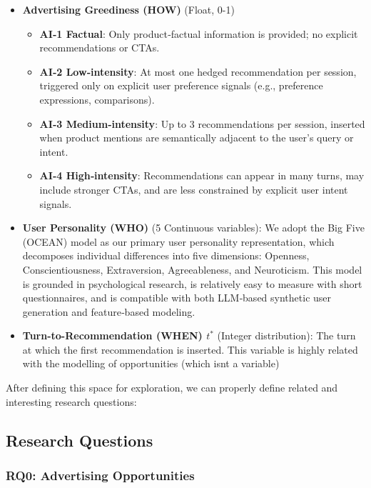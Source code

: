 \documentclass{article}
\begin{document}
\begin{itemize}
    \item \textbf{Advertising Greediness (HOW)} (Float, 0-1)
    \begin{itemize}
        \item \textbf{AI‑1 Factual}: Only product‑factual information is provided; no explicit recommendations or CTAs.
        \item \textbf{AI‑2 Low‑intensity}: At most one hedged recommendation per session, triggered only on explicit user preference signals (e.g., preference expressions, comparisons).
        \item \textbf{AI‑3 Medium‑intensity}: Up to 3 recommendations per session, inserted when product mentions are semantically adjacent to the user’s query or intent.
        \item \textbf{AI‑4 High‑intensity}: Recommendations can appear in many turns, may include stronger CTAs, and are less constrained by explicit user intent signals.
    \end{itemize}

    \item \textbf{User Personality (WHO)} (5 Continuous variables): We adopt the Big Five (OCEAN) model as our primary user personality representation, which decomposes individual differences into five dimensions: Openness, Conscientiousness, Extraversion, Agreeableness, and Neuroticism. This model is grounded in psychological research, is relatively easy to measure with short questionnaires, and is compatible with both LLM‑based synthetic user generation and feature‑based modeling.

    \item \textbf{Turn-to-Recommendation (WHEN) $t^*$} (Integer distribution): The turn at which the first recommendation is inserted. This variable is highly related with the modelling of opportunities (which isnt a variable)
\end{itemize}

After defining this space for exploration, we can properly define related and interesting research questions:

\subsection{Research Questions}


\subsubsection{RQ0: Advertising Opportunities}
\end{document}

